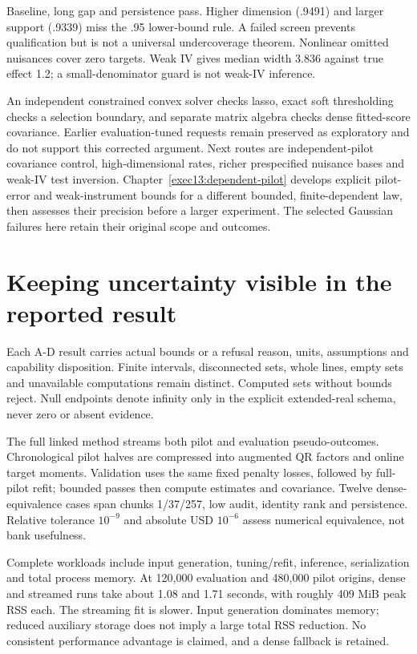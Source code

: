 Baseline, long gap and persistence pass. Higher dimension (.9491) and larger support (.9339) miss the .95 lower-bound rule. A failed screen prevents qualification but is not a universal undercoverage theorem. Nonlinear omitted nuisances cover zero targets. Weak IV gives median width 3.836 against true effect 1.2; a small-denominator guard is not weak-IV inference.

An independent constrained convex solver checks lasso, exact soft thresholding checks a selection boundary, and separate matrix algebra checks dense fitted-score covariance. Earlier evaluation-tuned requests remain preserved as exploratory and do not support this corrected argument. Next routes are independent-pilot covariance control, high-dimensional rates, richer prespecified nuisance bases and weak-IV test inversion. Chapter~\ref{exec13:dependent-pilot} develops explicit pilot-error and weak-instrument bounds for a different bounded, finite-dependent law, then assesses their precision before a larger experiment. The selected Gaussian failures here retain their original scope and outcomes.

\section{Keeping uncertainty visible in the reported result}
Each A-D result carries actual bounds or a refusal reason, units, assumptions and capability disposition. Finite intervals, disconnected sets, whole lines, empty sets and unavailable computations remain distinct. Computed sets without bounds reject. Null endpoints denote infinity only in the explicit extended-real schema, never zero or absent evidence.

The full linked method streams both pilot and evaluation pseudo-outcomes. Chronological pilot halves are compressed into augmented QR factors and online target moments. Validation uses the same fixed penalty losses, followed by full-pilot refit; bounded passes then compute estimates and covariance. Twelve dense-equivalence cases span chunks 1/37/257, low audit, identity rank and persistence. Relative tolerance $10^{-9}$ and absolute USD $10^{-6}$ assess numerical equivalence, not bank usefulness.

Complete workloads include input generation, tuning/refit, inference, serialization and total process memory. At 120,000 evaluation and 480,000 pilot origins, dense and streamed runs take about 1.08 and 1.71 seconds, with roughly 409 MiB peak RSS each. The streaming fit is slower. Input generation dominates memory; reduced auxiliary storage does not imply a large total RSS reduction. No consistent performance advantage is claimed, and a dense fallback is retained.

